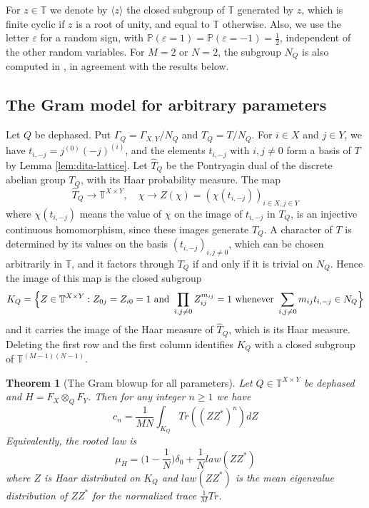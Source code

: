 \documentclass[11pt,reqno]{amsart}
\newtheorem{thm}{Theorem}[section]
\theoremstyle{definition}
\numberwithin{equation}{section}
\begin{document}
For $z\in\mathbb T$ we denote by $\langle z\rangle$ the closed subgroup of $\mathbb T$ generated by $z$, which is finite cyclic if $z$ is a root of unity, and equal to $\mathbb T$ otherwise. Also, we use the letter $\varepsilon$ for a random sign, with $\mathbb P(\varepsilon=1)=\mathbb P(\varepsilon=-1)=\frac12$, independent of the other random variables. For $M=2$ or $N=2$, the subgroup $N_Q$ is also computed in \cite[Theorems 4.5 and 4.6]{BO26}, in agreement with the results below.

\subsection{The Gram model for arbitrary parameters}

Let $Q$ be dephased. Put $\Gamma_Q=\Gamma_{X,Y}/N_Q$ and $T_Q=T/N_Q$. For $i\in X$ and $j\in Y$, we have $t_{i,-j}=j^{(0)}(-j)^{(i)}$, and the elements $t_{i,-j}$ with $i,j\neq0$ form a basis of $T$ by Lemma \ref{lem:dita-lattice}. Let $\widehat T_Q$ be the Pontryagin dual of the discrete abelian group $T_Q$, with its Haar probability measure. The map
$$\widehat T_Q\to\mathbb T^{X\times Y},
\quad \chi\to Z(\chi)=(\chi(t_{i,-j}))_{i\in X,j\in Y}$$
where $\chi(t_{i,-j})$ means the value of $\chi$ on the image of $t_{i,-j}$ in $T_Q$, is an injective continuous homomorphism, since these images generate $T_Q$. A character of $T$ is determined by its values on the basis $(t_{i,-j})_{i,j\neq0}$, which can be chosen arbitrarily in $\mathbb T$, and it factors through $T_Q$ if and only if it is trivial on $N_Q$. Hence the image of this map is the closed subgroup
\begin{equation}\label{eq:gram-group}
K_Q=\Big\{Z\in\mathbb T^{X\times Y}:Z_{0j}=Z_{i0}=1\ {\rm and}\ \prod_{i,j\neq0}Z_{ij}^{m_{ij}}=1\ {\rm whenever}\ \sum_{i,j\neq0}m_{ij}t_{i,-j}\in N_Q\Big\}
\end{equation}
and it carries the image of the Haar measure of $\widehat T_Q$, which is its Haar measure. Deleting the first row and the first column identifies $K_Q$ with a closed subgroup of $\mathbb T^{(M-1)(N-1)}$.

\begin{thm}[The Gram blowup for all parameters]\label{thm:gram-all}
Let $Q\in\mathbb T^{X\times Y}$ be dephased and $H=F_X\otimes_Q F_Y$. Then for any integer $n\geq1$ we have
\begin{equation}\label{eq:gram-all}
c_n=\frac1{MN}\int_{K_Q}Tr((ZZ^*)^n)dZ
\end{equation}
Equivalently, the rooted law is
$$\mu_H=\Big(1-\frac1N\Big)\delta_0+\frac1N law(ZZ^*)$$
where $Z$ is Haar distributed on $K_Q$ and $law(ZZ^*)$ is the mean eigenvalue distribution of $ZZ^*$ for the normalized trace $\frac1M Tr$.
\end{thm}
\end{document}
